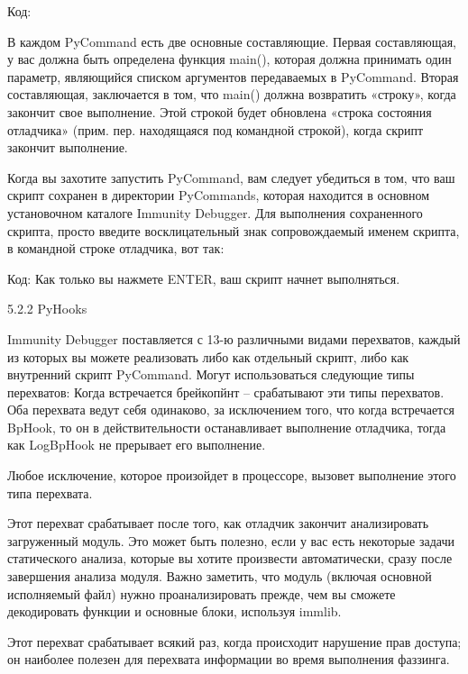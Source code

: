 \documentclass[12pt, a4paper, oneside]{book}
\begin{document}
Код:


В каждом PyCommand есть две основные составляющие. Первая составляющая, у вас должна быть определена функция main(), которая должна принимать один параметр, являющийся списком аргументов передаваемых в PyCommand. Вторая составляющая, заключается в том, что main() должна возвратить «строку», когда закончит свое выполнение. Этой строкой будет обновлена «строка состояния отладчика» (прим. пер. находящаяся под командной строкой), когда скрипт закончит выполнение.

Когда вы захотите запустить PyCommand, вам следует убедиться в том, что ваш скрипт сохранен в директории PyCommands, которая находится в основном установочном каталоге Immunity Debugger. Для выполнения сохраненного скрипта, просто введите восклицательный знак сопровождаемый именем скрипта, в командной строке отладчика, вот так:

Код:
Как только вы нажмете ENTER, ваш скрипт начнет выполняться.

5.2.2 PyHooks

Immunity Debugger поставляется с 13-ю различными видами перехватов, каждый из которых вы можете реализовать либо как отдельный скрипт, либо как внутренний скрипт PyCommand. Могут использоваться следующие типы перехватов: 
Когда встречается брейкопйнт – срабатывают эти типы перехватов. Оба перехвата ведут себя одинаково, за исключением того, что когда встречается BpHook, то он в действительности останавливает выполнение отладчика, тогда как LogBpHook не прерывает его выполнение.

Любое исключение, которое произойдет в процессоре, вызовет выполнение этого типа перехвата.

Этот перехват срабатывает после того, как отладчик закончит анализировать загруженный модуль. Это может быть полезно, если у вас есть некоторые задачи статического анализа, которые вы хотите произвести автоматически, сразу после завершения анализа модуля. Важно заметить, что модуль (включая основной исполняемый файл) нужно проанализировать прежде, чем вы сможете декодировать функции и основные блоки, используя immlib.

Этот перехват срабатывает всякий раз, когда происходит нарушение прав доступа; он наиболее полезен для перехвата информации во время выполнения фаззинга. 
\end{document}
